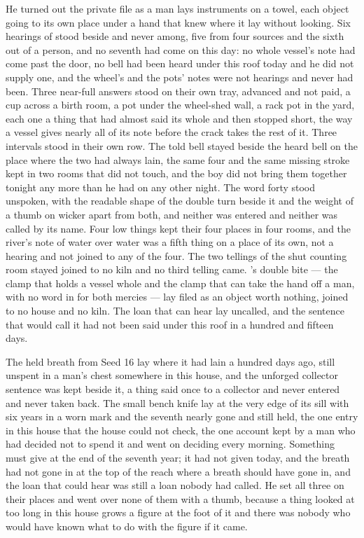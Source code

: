 He turned out the private file as a man lays instruments on a towel, each object going to its own place under a hand that knew where it lay without looking. Six hearings of  stood beside and never among, five from four sources and the sixth out of a person, and no seventh had come on this day: no whole vessel's note had come past the door, no bell had been heard under this roof today and he did not supply one, and the wheel's and the pots' notes were not hearings and never had been. Three near-full answers stood on their own tray, advanced and not paid, a cup across a birth room, a pot under the wheel-shed wall, a rack pot in the yard, each one a thing that had almost said its whole and then stopped short, the way a vessel gives nearly all of its note before the crack takes the rest of it. Three intervals stood in their own row. The told bell stayed beside the heard bell on the place where the two had always lain, the same four and the same missing stroke kept in two rooms that did not touch, and the boy did not bring them together tonight any more than he had on any other night. The word forty stood unspoken, with the readable shape of the double turn beside it and the weight of a thumb on wicker apart from both, and neither was entered and neither was called by its name. Four low things kept their four places in four rooms, and the river's note of water over water was a fifth thing on a place of its own, not a hearing and not joined to any of the four. The two tellings of the shut counting room stayed joined to no kiln and no third telling came. 's double bite --- the clamp that holds a vessel whole and the clamp that can take the hand off a man, with no word in  for both mercies --- lay filed as an object worth nothing, joined to no house and no kiln. The loan that can hear lay uncalled, and the sentence that would call it had not been said under this roof in a hundred and fifteen days.

The held breath from Seed 16 lay where it had lain a hundred days ago, still unspent in a man's chest somewhere in this house, and the unforged collector sentence was kept beside it, a thing said once to a collector and never entered and never taken back. The small bench knife lay at the very edge of its sill with six years in a worn mark and the seventh nearly gone and still held, the one entry in this house that the house could not check, the one account kept by a man who had decided not to spend it and went on deciding every morning. Something must give at the end of the seventh year; it had not given today, and the breath had not gone in at the top of the reach where a breath should have gone in, and the loan that could hear was still a loan nobody had called. He set all three on their places and went over none of them with a thumb, because a thing looked at too long in this house grows a figure at the foot of it and there was nobody who would have known what to do with the figure if it came.

